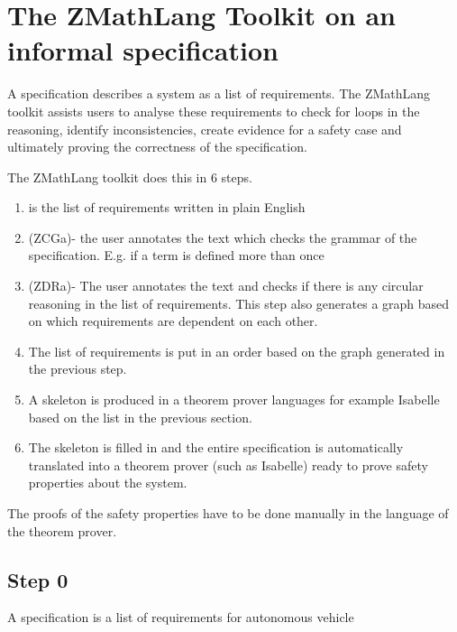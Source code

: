 \chapter{The ZMathLang Toolkit on an informal specification}

A specification describes a system as a list of requirements. The ZMathLang
toolkit assists users to analyse these requirements to check for loops in the
reasoning, identify inconsistencies, create evidence for a safety case and
ultimately proving the correctness of the specification. 

The ZMathLang toolkit does this in 6 steps.

\begin{enumerate}
    \item is the list of requirements written in plain English
    \item (ZCGa)- the user annotates the text which checks the grammar of the
    specification. E.g. if a term is defined more than once
    \item (ZDRa)- The user annotates the text and checks if there is any
    circular reasoning in the list of requirements. This step also generates a
    graph based on which requirements are dependent on each other.
    \item The list of requirements is put in an order based on the graph
    generated in the previous step.
    \item A skeleton is produced in a theorem prover languages for
    example Isabelle based on the list in the previous section.
    \item The skeleton is filled in and the entire specification is
    automatically translated into a theorem prover (such as Isabelle) ready to
    prove safety properties about the system.
\end{enumerate}

The proofs of the safety properties have to be done manually in the language of
the theorem prover.

\section{Step 0}

A specification is a list of requirements for autonomous vehicle

\noindent{}

